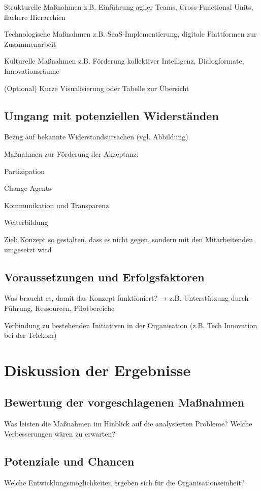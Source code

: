 \documentclass[12pt,a4paper]{article}
\begin{document}
	Strukturelle Maßnahmen
	z.B. Einführung agiler Teams, Cross-Functional Units, flachere Hierarchien
	
	Technologische Maßnahmen
	z.B. SaaS-Implementierung, digitale Plattformen zur Zusammenarbeit
	
	Kulturelle Maßnahmen
	z.B. Förderung kollektiver Intelligenz, Dialogformate, Innovationsräume
	
	(Optional) Kurze Visualisierung oder Tabelle zur Übersicht
	\subsection{Umgang mit potenziellen Widerständen}
	Bezug auf bekannte Widerstandsursachen (vgl. Abbildung)
	
	Maßnahmen zur Förderung der Akzeptanz:
	
	Partizipation
	
	Change Agents
	
	Kommunikation und Transparenz
	
	Weiterbildung
	
	Ziel: Konzept so gestalten, dass es nicht gegen, sondern mit den Mitarbeitenden umgesetzt wird
	
	\subsection{Voraussetzungen und Erfolgsfaktoren}
	Was braucht es, damit das Konzept funktioniert?
	→ z.B. Unterstützung durch Führung, Ressourcen, Pilotbereiche
	
	Verbindung zu bestehenden Initiativen in der Organisation (z.B. Tech  Innovation bei der Telekom)
	
	\section{Diskussion der Ergebnisse}
	\subsection{Bewertung der vorgeschlagenen Maßnahmen}
	
	Was leisten die Maßnahmen im Hinblick auf die analysierten Probleme?
	Welche Verbesserungen wären zu erwarten?
	\subsection{Potenziale und Chancen}
	Welche Entwicklungsmöglichkeiten ergeben sich für die Organisationseinheit?
	
\end{document}
